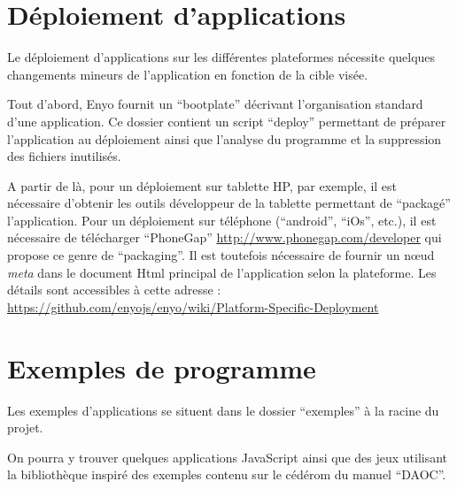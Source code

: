\documentclass[11pt,a4paper]{report}
\begin{document}


\section{Déploiement d'applications}

Le déploiement d'applications sur les différentes plateformes nécessite quelques changements mineurs 
de l'application en fonction de la cible visée.

Tout d'abord, Enyo fournit un ``bootplate'' décrivant l'organisation standard d'une application.
Ce dossier contient un script ``deploy'' permettant de préparer l'application au 
déploiement ainsi que l'analyse du programme et la suppression des fichiers inutilisés.

A partir de là, pour un déploiement sur tablette HP, par exemple, il est nécessaire d'obtenir les outils
développeur de la tablette permettant de ``packagé'' l'application.
Pour un déploiement sur téléphone (``android'', ``iOs'', etc.), il est nécessaire de télécharger
``PhoneGap'' \url{http://www.phonegap.com/developer} qui propose ce genre de ``packaging''.
Il est toutefois nécessaire de fournir un n\oe{}ud \emph{meta} dans le document Html principal de l'application
selon la plateforme.
Les détails sont accessibles à cette adresse : \\
\url{https://github.com/enyojs/enyo/wiki/Platform-Specific-Deployment}

\section{Exemples de programme}

Les exemples d'applications se situent dans le dossier ``exemples'' à la racine du projet.

On pourra y trouver quelques applications JavaScript ainsi que des jeux utilisant la bibliothèque inspiré des exemples contenu sur le cédérom 
du manuel ``DAOC''\cite{DAOC}.

\tableofcontents
\nocite{*}


\end{document}
